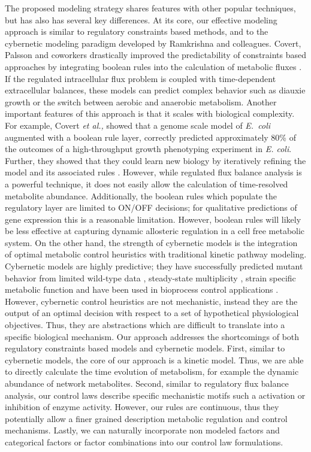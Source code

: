 \documentclass[processes,article,accept,moreauthors,pdftex,12pt,a4paper]{mdpi}
\begin{document}
The proposed modeling strategy shares features with other popular techniques, but has also has several key differences. 
At its core, our effective modeling approach is similar to regulatory constraints based methods, and to the cybernetic modeling paradigm developed by Ramkrishna and colleagues.
Covert, Palsson and coworkers drastically improved the predictability of constraints based approaches by integrating boolean rules into the calculation of metabolic fluxes \citep{Covert:2001aa}.
If the regulated intracellular flux problem is coupled with time-dependent extracellular balances, these models can predict complex behavior such as diauxie growth or the switch between 
aerobic and anaerobic metabolism. Another important features of this approach is that it scales with biological complexity. 
For example, Covert \emph{et al.,} showed that a genome scale model of \emph{E.~coli} augmented with a boolean rule layer, 
correctly predicted approximately 80\% of the outcomes of a high-throughput growth phenotyping experiment in \emph{E. coli}.
Further, they showed that they could learn new biology by iteratively refining the model and its associated rules \citep{Covert:2004aa}. 
However, while regulated flux balance analysis is a powerful technique, it does not easily allow the calculation of time-resolved metabolite abundance. 
Additionally, the boolean rules which populate the regulatory layer are limited to ON/OFF decisions; for qualitative predictions of gene expression this is a reasonable limitation. 
However, boolean rules will likely be less effective at capturing dynamic allosteric regulation in a cell free metabolic system. 
On the other hand, the strength of cybernetic models is the integration of optimal metabolic control heuristics with traditional kinetic pathway modeling. 
Cybernetic models are highly predictive; they have successfully predicted mutant behavior from limited wild-type data \citep{1999_varner_ramkrishna_MetaEng,Varner:2000aa,Song:2012aa}, 
steady-state multiplicity \citep{2012_kim_ramkrishna_BiotechProg}, strain specific metabolic function \citep{Song:2011aa} and have been used in bioprocess control applications \citep{Gadkar:2003aa}.
However, cybernetic control heuristics are not mechanistic, instead they are the output of an optimal decision with respect to a set of hypothetical physiological objectives. 
Thus, they are abstractions which are difficult to translate into a specific biological mechanism. 
Our approach addresses the shortcomings of both regulatory constraints based models and cybernetic models. 
First, similar to cybernetic models, the core of our approach is a kinetic model. Thus, we are able to directly calculate the time evolution of metabolism, for example the dynamic abundance of 
network metabolites. Second, similar to regulatory flux balance analysis, our control laws describe specific mechanistic motifs such a activation or inhibition of enzyme activity. 
However, our rules are continuous, thus they potentially allow a finer grained description metabolic regulation and control mechanisms.
Lastly, we can naturally incorporate non modeled factors and categorical factors or factor combinations into our control law formulations.
\end{document}
